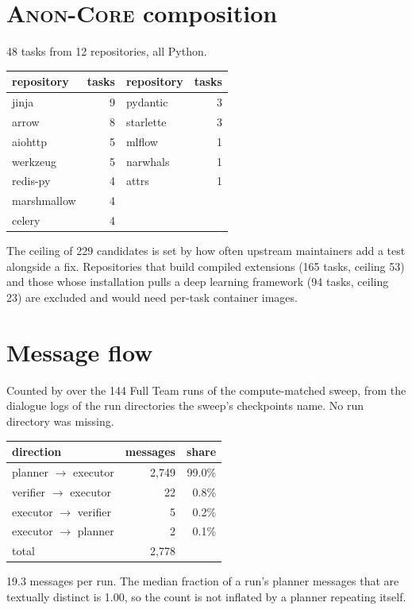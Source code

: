 \documentclass[11pt]{article}
\newcommand{\pth}[1]{\path{#1}}
\newcommand{\core}{\textsc{Anon-Core}}
\newcommand{\core}{\textsc{TeamBench-Core}}
\begin{document}
\section{\core{} composition}
\label{app:core}

48 tasks from 12 repositories, all Python.

\begin{center}\small
\begin{tabular}{lr@{\qquad}lr}
\toprule
repository & tasks & repository & tasks \\
\midrule
jinja       & 9 & pydantic  & 3 \\
arrow       & 8 & starlette & 3 \\
aiohttp     & 5 & mlflow    & 1 \\
werkzeug    & 5 & narwhals  & 1 \\
redis-py    & 4 & attrs     & 1 \\
marshmallow & 4 &           &   \\
celery      & 4 &           &   \\
\bottomrule
\end{tabular}
\end{center}

The ceiling of 229 candidates is set by how often upstream maintainers add a
test alongside a fix. Repositories that build compiled extensions (165 tasks,
ceiling 53) and those whose installation pulls a deep learning framework (94
tasks, ceiling 23) are excluded and would need per-task container images.

\section{Message flow}
\label{app:messages}

Counted by \pth{scripts/message_flow.py} over the 144 Full Team runs of the
compute-matched sweep, from the dialogue logs of the run directories the sweep's
checkpoints name. No run directory was missing.

\begin{center}\small
\begin{tabular}{lrr}
\toprule
direction & messages & share \\
\midrule
planner $\to$ executor  & 2{,}749 & 99.0\% \\
verifier $\to$ executor &      22 &  0.8\% \\
executor $\to$ verifier &       5 &  0.2\% \\
executor $\to$ planner  &       2 &  0.1\% \\
\midrule
total                   & 2{,}778 & \\
\bottomrule
\end{tabular}
\end{center}

19.3 messages per run. The median fraction of a run's planner messages that are
textually distinct is 1.00, so the count is not inflated by a planner repeating
itself.
\end{document}
